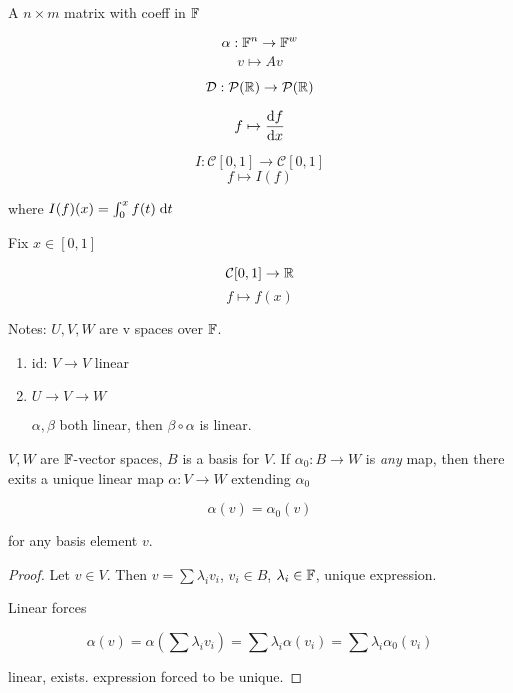 \documentclass[a4paper]{article}
\begin{document}
\begin{eg}
	A $ n \times m $ matrix with coeff in $ \mathbb{F} $
	
	\[ \alpha: \mathbb{F}^{n} \to \mathbb{F}^{w} \]
	\[ v \mapsto A v \]
\end{eg}

\begin{eg}
	\[ \mathcal{D} : \mathcal{P}(\mathbb{R}) \to \mathcal{P}(\mathbb{R}) \]
	
	\[ f \mapsto \frac{\mathrm{d} f}{\mathrm{d} x} \]
\end{eg}


\begin{eg}
	\[ I: \mathcal{C}[0,1] \to \mathcal{C}[0,1] \]
	\[ f \mapsto I(f) \]
	
	where $ I(f)(x) = \int_{0}^{x} f(t) \; \mathrm{d} t $
\end{eg}

\begin{eg}
	Fix $ x \in [0,1] $
	
	\[ \mathcal{C}[0,1] \to \mathbb{R} \]
	\[ f \mapsto f(x) \]
\end{eg}

Notes: $ U,V,W $ are v spaces over $ \mathbb{F} $.

\begin{enumerate}
	\item id: $ V \to V $ linear
	\item $ U \to V \to W $
	
	
	$ \alpha,\beta $ both linear, then $ \beta \circ \alpha $ is linear.
	
\end{enumerate}

\begin{lemma} 
	$ V,W $ are $ \mathbb{F} $-vector spaces, $ B $ is a basis for $ V $.
	If $ \alpha_{0} : B \to W $ is \emph{any} map, then there exits a unique linear map $ \alpha : V \to W $ extending $ \alpha_{0} $
	
	\[ \alpha(v) = \alpha_{0}(v) \]
	
	for any basis element $ v $. 
	
\end{lemma}


\begin{proof}
	Let $ v  \in V $. Then $ v = \sum \lambda_{i} v_{i} $, $ v_{i} \in B $, $ \lambda_{i} \in \mathbb{F} $, unique expression. 
	
	Linear forces
	
	\[ \alpha(v) = \alpha\left( \sum \lambda_{i} v_{i} \right) = \sum \lambda_{i} \alpha(v_{i}) = \sum \lambda_{i} \alpha_{0}(v_{i})  \]
	
	linear, exists.
	expression forced to be unique. 
\end{proof}
\end{document}
